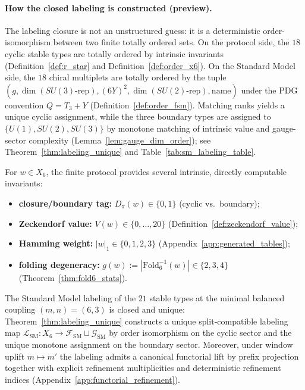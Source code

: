 \paragraph{How the closed labeling is constructed (preview).}
The labeling closure is not an unstructured guess: it is a deterministic order-isomorphism between two finite totally ordered sets.
On the protocol side, the $18$ cyclic stable types are totally ordered by intrinsic invariants (Definition~\ref{def:r_star} and Definition~\ref{def:order_x6}).
On the Standard Model side, the $18$ chiral multiplets are totally ordered by the tuple $(g,\dim(SU(3)\text{-rep}),(6Y)^2,\dim(SU(2)\text{-rep}),\text{name})$ under the PDG convention $Q=T_3+Y$ (Definition~\ref{def:order_fsm}).
Matching ranks yields a unique cyclic assignment, while the three boundary types are assigned to $\{U(1),SU(2),SU(3)\}$ by monotone matching of intrinsic value and gauge-sector complexity (Lemma~\ref{lem:gauge_dim_order}); see Theorem~\ref{thm:labeling_unique} and Table~\ref{tab:sm_labeling_table}.

\begin{definition}\label{def:x6_invariants}
For $w\in X_6$, the finite protocol provides several intrinsic, directly computable invariants:
\begin{itemize}
\item \textbf{closure/boundary tag:} $D_\pi(w)\in\{0,1\}$ (cyclic vs.\ boundary);
\item \textbf{Zeckendorf value:} $V(w)\in\{0,\dots,20\}$ (Definition~\ref{def:zeckendorf_value});
\item \textbf{Hamming weight:} $|w|_1\in\{0,1,2,3\}$ (Appendix~\ref{app:generated_tables});
\item \textbf{folding degeneracy:} $g(w):=|\mathrm{Fold}_6^{-1}(w)|\in\{2,3,4\}$ (Theorem~\ref{thm:fold6_stats}).
\end{itemize}
\end{definition}

\begin{proposition}[Closed Standard Model labeling at $(m,n)=(6,3)$]\label{prop:sm_labeling_closed}
The Standard Model labeling of the $21$ stable types at the minimal balanced coupling $(m,n)=(6,3)$ is closed and unique:
Theorem~\ref{thm:labeling_unique} constructs a unique split-compatible labeling map $\mathcal{L}_{\mathrm{SM}}:X_6\to \mathcal{F}_{\mathrm{SM}}\sqcup\mathcal{G}_{\mathrm{SM}}$ by order isomorphism on the cyclic sector and the unique monotone assignment on the boundary sector.
Moreover, under window uplift $m\mapsto m'$ the labeling admits a canonical functorial lift by prefix projection together with explicit refinement multiplicities and deterministic refinement indices (Appendix~\ref{app:functorial_refinement}).
\end{proposition}

